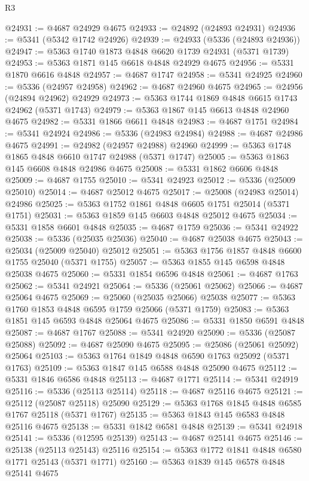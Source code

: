 \begin{lexlean}{R3}
\begin{coremodule}
@24931 := @4687 @24929 @4675
@24933 := @24892 (@24893 @24931)
@24936 := @5341 (@5342 @1742 @24926)
@24939 := @24933 (@5336 (@24893 @24936))
@24947 := @5363 @1740 @1873 @4848 @6620 @1739 @24931 (@5371 @1739)
@24953 := @5363 @1871 @145 @6618 @4848 @24929 @4675
@24956 := @5331 @1870 @6616 @4848
@24957 := @4687 @1747
@24958 := @5341 @24925
@24960 := @5336 (@24957 @24958)
@24962 := @4687 @24960 @4675
@24965 := @24956 (@24894 @24962) @24929
@24973 := @5363 @1744 @1869 @4848 @6615 @1743 @24962 (@5371 @1743)
@24979 := @5363 @1867 @145 @6613 @4848 @24960 @4675
@24982 := @5331 @1866 @6611 @4848
@24983 := @4687 @1751
@24984 := @5341 @24924
@24986 := @5336 (@24983 @24984)
@24988 := @4687 @24986 @4675
@24991 := @24982 (@24957 @24988) @24960
@24999 := @5363 @1748 @1865 @4848 @6610 @1747 @24988 (@5371 @1747)
@25005 := @5363 @1863 @145 @6608 @4848 @24986 @4675
@25008 := @5331 @1862 @6606 @4848
@25009 := @4687 @1755
@25010 := @5341 @24923
@25012 := @5336 (@25009 @25010)
@25014 := @4687 @25012 @4675
@25017 := @25008 (@24983 @25014) @24986
@25025 := @5363 @1752 @1861 @4848 @6605 @1751 @25014 (@5371 @1751)
@25031 := @5363 @1859 @145 @6603 @4848 @25012 @4675
@25034 := @5331 @1858 @6601 @4848
@25035 := @4687 @1759
@25036 := @5341 @24922
@25038 := @5336 (@25035 @25036)
@25040 := @4687 @25038 @4675
@25043 := @25034 (@25009 @25040) @25012
@25051 := @5363 @1756 @1857 @4848 @6600 @1755 @25040 (@5371 @1755)
@25057 := @5363 @1855 @145 @6598 @4848 @25038 @4675
@25060 := @5331 @1854 @6596 @4848
@25061 := @4687 @1763
@25062 := @5341 @24921
@25064 := @5336 (@25061 @25062)
@25066 := @4687 @25064 @4675
@25069 := @25060 (@25035 @25066) @25038
@25077 := @5363 @1760 @1853 @4848 @6595 @1759 @25066 (@5371 @1759)
@25083 := @5363 @1851 @145 @6593 @4848 @25064 @4675
@25086 := @5331 @1850 @6591 @4848
@25087 := @4687 @1767
@25088 := @5341 @24920
@25090 := @5336 (@25087 @25088)
@25092 := @4687 @25090 @4675
@25095 := @25086 (@25061 @25092) @25064
@25103 := @5363 @1764 @1849 @4848 @6590 @1763 @25092 (@5371 @1763)
@25109 := @5363 @1847 @145 @6588 @4848 @25090 @4675
@25112 := @5331 @1846 @6586 @4848
@25113 := @4687 @1771
@25114 := @5341 @24919
@25116 := @5336 (@25113 @25114)
@25118 := @4687 @25116 @4675
@25121 := @25112 (@25087 @25118) @25090
@25129 := @5363 @1768 @1845 @4848 @6585 @1767 @25118 (@5371 @1767)
@25135 := @5363 @1843 @145 @6583 @4848 @25116 @4675
@25138 := @5331 @1842 @6581 @4848
@25139 := @5341 @24918
@25141 := @5336 (@12595 @25139)
@25143 := @4687 @25141 @4675
@25146 := @25138 (@25113 @25143) @25116
@25154 := @5363 @1772 @1841 @4848 @6580 @1771 @25143 (@5371 @1771)
@25160 := @5363 @1839 @145 @6578 @4848 @25141 @4675

\end{coremodule}
\end{lexlean}

